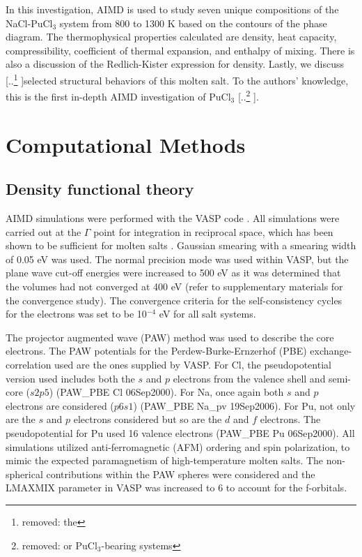 \documentclass[review]{elsarticle}
\providecommand{\DIFaddtex}[1]{{\protect\color{blue} \sf #1}} %
\providecommand{\DIFdeltex}[1]{{\protect\color{red} [..\footnote{removed: #1} ]}} %
\providecommand{\DIFaddbegin}{} %
\providecommand{\DIFaddend}{} %
\providecommand{\DIFdelbegin}{} %
\providecommand{\DIFdelend}{} %
\providecommand{\DIFadd}[1]{\texorpdfstring{\DIFaddtex{#1}}{#1}} %
\providecommand{\DIFdel}[1]{\texorpdfstring{\DIFdeltex{#1}}{}} %
\newcommand{\DIFscaledelfig}{0.5}
\newlength{\DIFdelgraphicswidth} %
\newlength{\DIFdelgraphicsheight} %
\newcommand{\DIFaddincludegraphics}[2][]{{\color{blue}\fbox{\DIFOincludegraphics[#1]{#2}}}} %
\newcommand{\DIFdelincludegraphics}[2][]{%
\sbox{\DIFdelgraphicsbox}{\DIFOincludegraphics[#1]{#2}}%
\settoboxwidth{\DIFdelgraphicswidth}{\DIFdelgraphicsbox} %
\settoboxtotalheight{\DIFdelgraphicsheight}{\DIFdelgraphicsbox} %
\scalebox{\DIFscaledelfig}{%
\parbox[b]{\DIFdelgraphicswidth}{\usebox{\DIFdelgraphicsbox}\\[-\baselineskip] \rule{\DIFdelgraphicswidth}{0em}}\llap{\resizebox{\DIFdelgraphicswidth}{\DIFdelgraphicsheight}{%
\setlength{\unitlength}{\DIFdelgraphicswidth}%
\begin{picture}(1,1)%
\thicklines\linethickness{2pt} %
{\color[rgb]{1,0,0}\put(0,0){\framebox(1,1){}}}%
{\color[rgb]{1,0,0}\put(0,0){\line( 1,1){1}}}%
{\color[rgb]{1,0,0}\put(0,1){\line(1,-1){1}}}%
\end{picture}%
}\hspace*{3pt}}} %
} %
\DeclareRobustCommand{\DIFaddbegin}{\DIFOaddbegin \let\includegraphics\DIFaddincludegraphics} %
\DeclareRobustCommand{\DIFaddend}{\DIFOaddend \let\includegraphics\DIFOincludegraphics} %
\DeclareRobustCommand{\DIFdelbegin}{\DIFOdelbegin \let\includegraphics\DIFdelincludegraphics} %
\DeclareRobustCommand{\DIFdelend}{\DIFOaddend \let\includegraphics\DIFOincludegraphics} %
\begin{document}
In this investigation, AIMD is used to study seven unique compositions of the NaCl-PuCl$_3$ system from 800 to 1300 K based on the contours of the phase diagram. The thermophysical properties calculated are density, heat capacity, compressibility, coefficient of thermal expansion, and enthalpy of mixing. There is also a discussion of the Redlich-Kister expression for density. Lastly, we discuss \DIFdelbegin \DIFdel{the }\DIFdelend selected structural behaviors of this molten salt. To the authors' knowledge, this is the first in-depth AIMD investigation of PuCl$_3$\DIFdelbegin \DIFdel{or PuCl$_3$-bearing systems}\DIFdelend .

\section{Computational Methods}
\subsection{Density functional theory}
AIMD simulations were performed with the VASP code \cite{Kresse1993, Kresse1996, Kresse1996a}. All simulations were carried out at the $\Gamma$ point for integration in reciprocal space, which has been shown to be sufficient for molten salts \cite{NAM2015224, Bengston2014, ANDERSSON2022153836,duemmler_liclkcl,duemmler_naclmgcl}. Gaussian smearing with a smearing width of 0.05 eV was used. The normal precision mode was used within VASP, but the plane wave cut-off energies were increased to 500 eV \DIFaddbegin \DIFadd{as it was determined that the volumes had not converged at 400 eV (refer to supplementary materials for the convergence study)}\DIFaddend . The convergence criteria for the self-consistency cycles for the electrons was set to be 10$^{-4}$ eV for all salt systems. 

The projector augmented wave (PAW) method was used to describe the core electrons\cite{Kresse1996a,kresse1999ultrasoft}. The PAW potentials for the Perdew-Burke-Ernzerhof (PBE) \cite{perdew1996} exchange-correlation used are the ones supplied by VASP. For Cl, the pseudopotential version used includes both the $s$ and $p$ electrons from the valence shell and semi-core ($s2p5$) (PAW\_PBE Cl 06Sep2000). For Na, once again both $s$ and $p$ electrons are considered ($p6s1$) (PAW\_PBE Na\_pv 19Sep2006). For Pu, not only are the $s$ and $p$ electrons considered but so are the $d$ and $f$ electrons. The pseudopotential for Pu used 16 valence electrons (PAW\_PBE Pu 06Sep2000). All simulations utilized anti-ferromagnetic (AFM) ordering and spin polarization, to mimic the expected paramagnetism of high-temperature molten salts. \DIFaddbegin \DIFadd{The non-spherical contributions within the PAW spheres were considered and the LMAXMIX parameter in VASP was increased to 6 to account for the f-orbitals.
}\DIFaddend 
\end{document}
